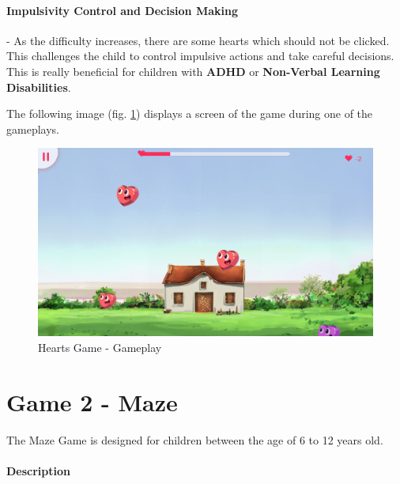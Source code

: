 \paragraph{Impulsivity Control and Decision Making}- As the difficulty increases, there are some hearts which should not be clicked. This challenges the child to control impulsive actions and take careful decisions. This is really beneficial for children with \textbf{ADHD} or \textbf{Non-Verbal Learning Disabilities}.



The following image (fig. \ref{fig:heartsGameplay}) displays a screen of the game during one of the gameplays.

\begin{figure}[H]
    \centering
    \includegraphics[scale=0.45]{Chapters/gameplay/HeartsGame.png}
    \caption{Hearts Game - Gameplay}
    \label{fig:heartsGameplay}    
\end{figure}


\newpage
\section{Game 2 - Maze}

The Maze Game is designed for children between the age of 6 to 12 years old.

\paragraph{Description}


